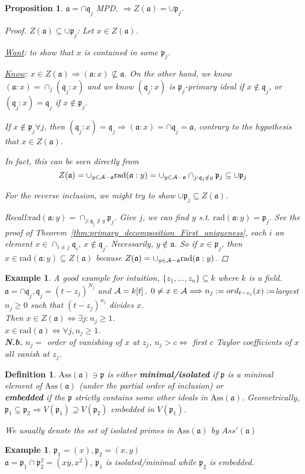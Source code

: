 \documentclass[11pt]{article}
\newtheorem{prop}[thm]{Proposition}
\newtheorem{dfn}[thm]{Definition}
\newtheorem{ex}[thm]{Example}
\newcommand{\sca}{{\mathfrak a}}
\newcommand{\scp}{{\mathfrak p}}
\newcommand{\scq}{\mathfrak q}
\newcommand{\cala}{{\cal A}}
\newcommand{\Lrta}{\Longrightarrow}
\newcommand{\Llrta}{\Longleftrightarrow}
\begin{document}
\begin{prop}
$\sca=\cap\scq_j$ MPD,
$\Lrta Z(\sca)=\cup\scp_j$.
\begin{proof}
$Z(\sca)\subseteq \cup\scp_j$: Let $x\in Z(\sca)$. 

\underline{Want}:  to show that $x$ is contained in some $\scp_j$. 

\underline{Know}: $x\in Z(\sca)\Lrta(\sca:x)\not \subseteq \sca$. On the other hand, we know $(\sca:x)=\cap_j(\scq_j:x)$ and we know $(\scq_j:x)$ is $\scp_j$-primary ideal if $x\notin\scq_j$, or $(\scq_j:x)=\scq_j$ if $x\notin\scp_j$.

If $x\notin\scp_j\forall j$, then $(\scq_j:x)=\scq_j\Lrta (\sca:x)=\cap {\scq_j}=\sca$, contrary to the hypothesis that $x\in Z(\sca)$.

{\color{red} In fact, this can be seen directly from $$Z(\sca)=\cup_{y\in\cala-\sca}\text{rad}(\sca:y)=\cup_{y\in\cala-\sca}\cap_{j:\scq_j\notin y}\scp_j\subseteq\cup \scp_j$$ }

For the reverse inclusion, we might try to show  $\cup\scp_j\subseteq Z(\sca)$.

Recall:$\text{rad}(\sca:y)=\cap_{j:\scq_j\not \ni y}\scp_j$. Give $j$, we can find $y$ s.t. $\text{rad}(\sca:y)=\scp_j$. See the proof of Theorem~\ref{thm:primary_decomposition_First_uniqueness},  each $i$ an element $x\in\cap_{i\neq j}\scq_i$, $x\notin\scq_j$. Necessarily, $y\notin\sca$. So if $x\in \scp_j$, then $x\in  \text{rad}(\sca:y)\subseteq Z(\sca)$ because $Z(\sca)=\cup_{y\in\cala-\sca}\text{rad}(\sca:y)$.
\end{proof}
\end{prop}

\begin{ex}
A good example for intuition, $\{z_1,...,z_n\}\subseteq k$ where $k$ is a field. $\sca=\cap \scq_j, \scq_j=(t-z_j)^{N_j}$ and $\cala=k[t]$.
$0\neq x\in\cala\Lrta n_j:=ord_{t-z_j}(x):=$largest $n_j\geq 0$ such that $(t-z_j)^{n_j}$ divides $x$.\\
Then $x\in Z(\sca)\Llrta \exists j:n_j\geq 1$.\\
$x\in \text{rad}(\sca)\Llrta \forall j, n_j\geq1$.\\
\textbf{N.b.} $n_j=$ order of vanishing of $x $ at $z_j$, $n_j> c\Llrta $ first $c$ Taylor coefficients of $x$ all vanish at $z_j$.
\end{ex}
\begin{dfn}
$\text{Ass}(  \sca)\ni \scp$ is either \textbf{minimal/isolated} if $\scp$ is a minimal element of $\text{Ass}(  \sca)$ (under the partial order of inclusion) or\\
\textbf{embedded} if the $\scp$ strictly contains some other ideals in $\text{Ass}(\sca)$. Geometrically, $\scp_1\subsetneq \scp_2\Lrta V(\scp_1)\supseteq V(\scp_2)$ embedded in $V(\scp_1)$. 

We usually denote the set of isolated primes in $\text{Ass}(  \sca)$ by $Ass'(\sca)$
\end{dfn}
\begin{ex}
$\scp_1=(x), \scp_2=(x,y)$\\
$\sca=\scp_1\cap\scp_2^2=(xy,x^2)$, $\scp_1$ is isolated/minimal while $\scp_2$ is embedded.
\end{ex}
\end{document}
